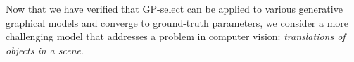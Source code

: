 
Now that we have verified that GP-select can be applied to various generative graphical models and converge to ground-truth parameters, we consider a more challenging model that addresses a problem in computer vision: \emph{translations of objects in a scene}.

